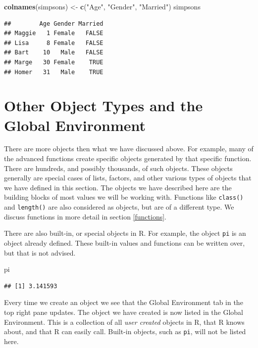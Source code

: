 \documentclass[
]{book}
\newenvironment{Shaded}{\begin{snugshade}}{\end{snugshade}}
\newcommand{\KeywordTok}[1]{\textcolor[rgb]{0.13,0.29,0.53}{\textbf{#1}}}
\newcommand{\NormalTok}[1]{#1}
\newcommand{\StringTok}[1]{\textcolor[rgb]{0.31,0.60,0.02}{#1}}
\begin{document}
\begin{Shaded}
\begin{Highlighting}[]
\KeywordTok{colnames}\NormalTok{(simpsons) <-}\StringTok{ }\KeywordTok{c}\NormalTok{(}\StringTok{"Age"}\NormalTok{, }\StringTok{"Gender"}\NormalTok{, }\StringTok{"Married"}\NormalTok{)}
\NormalTok{simpsons}
\end{Highlighting}
\end{Shaded}

\begin{verbatim}
##        Age Gender Married
## Maggie   1 Female   FALSE
## Lisa     8 Female   FALSE
## Bart    10   Male   FALSE
## Marge   30 Female    TRUE
## Homer   31   Male    TRUE
\end{verbatim}

\hypertarget{other-object-types-and-the-global-environment}{%
\section{Other Object Types and the Global Environment}\label{other-object-types-and-the-global-environment}}

There are more objects then what we have discussed above. For example, many of the advanced functions create specific objects generated by that specific function. There are hundreds, and possibly thousands, of such objects. These objects generally are special cases of lists, factors, and other various types of objects that we have defined in this section. The objects we have described here are the building blocks of most values we will be working with. Functions like \texttt{class()} and \texttt{length()} are also considered as objects, but are of a different type. We discuss functions in more detail in section \ref{functions}.

There are also built-in, or special objects in R. For example, the object \texttt{pi} is an object already defined. These built-in values and functions can be written over, but that is not advised.

\begin{Shaded}
\begin{Highlighting}[]
\NormalTok{pi}
\end{Highlighting}
\end{Shaded}

\begin{verbatim}
## [1] 3.141593
\end{verbatim}

Every time we create an object we see that the Global Environment tab in the top right pane updates. The object we have created is now listed in the Global Environment. This is a collection of all \emph{user created} objects in R, that R knows about, and that R can easily call. Built-in objects, such as \texttt{pi}, will not be listed here.
\end{document}
